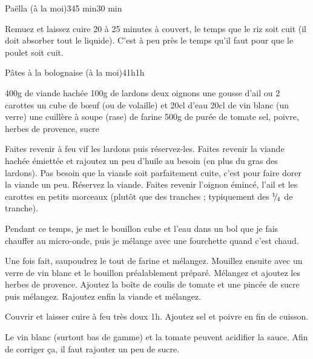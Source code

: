 \begin{recette}{Paëlla (à la moi)}{3}{45 min}{30 min}
\begin{cuisson}
Remuez et laissez cuire 20 à 25 minutes à couvert, le temps que le riz soit cuit (il doit absorber tout le liquide). C'est à peu près le temps qu'il faut pour que le poulet soit cuit. 
\end{cuisson}


\end{recette}

\begin{recette}{Pâtes à la bolognaise (à la moi)}{4}{1h}{1h}
\begin{ingredients}
\ingredient 400g de viande hachée
\ingredient 100g de lardons
\ingredient deux oignons
\ingredient une gousse d'ail
 ou 2 carottes
\ingredient un cube de bœuf (ou de volaille) et 20cl d'eau
\ingredient 20cl de vin blanc (un verre)
\ingredient une cuillère à soupe (rase) de farine
\ingredient 500g de purée de tomate
\ingredient sel, poivre, herbes de provence, sucre
\end{ingredients}

\begin{preparation}
\etape Faites revenir à feu vif les lardons puis réservez-les.
\etape Faites revenir la viande hachée émiettée et rajoutez un peu d'huile au besoin (en plus du gras des lardons). Pas besoin que la viande soit parfaitement cuite, c'est pour faire dorer la viande un peu.
\etape Réservez la viande.
\etape Faites revenir l'oignon émincé, l'ail et les carottes en petits morceaux (plutôt que des tranches ; typiquement des ${{}^{1\!\!}/ _{\!4}}$ de tranche).
\begin{remarque}
Pendant ce temps, je met le bouillon cube et l'eau dans un bol que je fais chauffer au micro-onde, puis je mélange avec une fourchette quand c'est chaud.
\end{remarque}
\etape Une fois fait, saupoudrez le tout de farine et mélangez. Mouillez ensuite avec un verre de vin blanc et le bouillon préalablement préparé. Mélangez et ajoutez les herbes de provence.
\etape Ajoutez la boîte de coulis de tomate et une pincée de sucre puis mélangez.
\etape Rajoutez enfin la viande et mélangez.
\end{preparation}

\begin{cuisson}
Couvrir et laisser cuire à feu très doux 1h. Ajoutez sel et poivre en fin de cuisson.
\begin{remarque}
Le vin blanc (surtout bas de gamme) et la tomate peuvent acidifier la sauce. Afin de corriger ça, il faut rajouter un peu de sucre.
\end{remarque}
\end{cuisson}
\end{recette}


